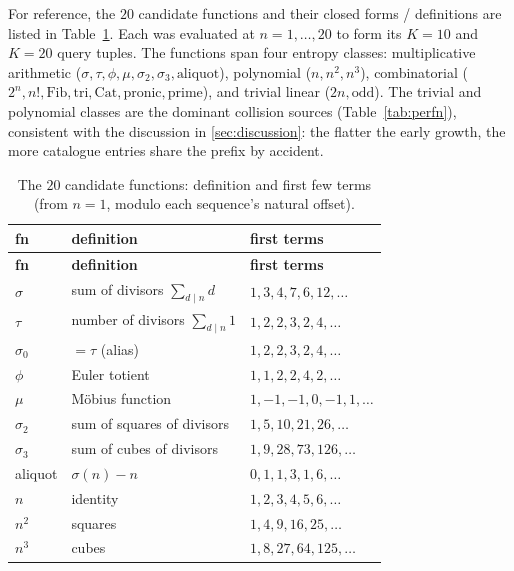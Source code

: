 \documentclass[11pt,a4paper]{article}
\newcommand{\sig}{\sigma}
\newcommand{\Kten}{K\!=\!10}
\newcommand{\Ktwenty}{K\!=\!20}
\theoremstyle{definition}
\begin{document}
For reference, the $20$ candidate functions and their closed forms / definitions
are listed in Table~\ref{tab:defs}. Each was evaluated at $n=1,\dots,20$ to form
its $\Kten$ and $\Ktwenty$ query tuples. The functions span four entropy classes:
multiplicative arithmetic ($\sig,\tau,\phi,\mu,\sig_2,\sig_3,\text{aliquot}$),
polynomial ($n,n^2,n^3$), combinatorial ($2^n,n!,\text{Fib},\text{tri},
\text{Cat},\text{pronic},\text{prime}$), and trivial linear ($2n,\text{odd}$).
The trivial and polynomial classes are the dominant collision sources
(Table~\ref{tab:perfn}), consistent with the discussion in
\textsection\ref{sec:discussion}: the flatter the early growth, the more
catalogue entries share the prefix by accident.

\begin{longtable}{@{}lll@{}}
\caption{The $20$ candidate functions: definition and first few terms (from
$n=1$, modulo each sequence's natural offset).}
\label{tab:defs}\\
\toprule
\textbf{fn} & \textbf{definition} & \textbf{first terms}\\
\midrule
\endfirsthead
\toprule
\textbf{fn} & \textbf{definition} & \textbf{first terms}\\
\midrule
\endhead
$\sig$      & sum of divisors $\sum_{d\mid n} d$        & $1,3,4,7,6,12,\dots$\\
$\tau$      & number of divisors $\sum_{d\mid n} 1$     & $1,2,2,3,2,4,\dots$\\
$\sig_0$    & $=\tau$ (alias)                            & $1,2,2,3,2,4,\dots$\\
$\phi$      & Euler totient                             & $1,1,2,2,4,2,\dots$\\
$\mu$       & M\"obius function                          & $1,-1,-1,0,-1,1,\dots$\\
$\sig_2$    & sum of squares of divisors                & $1,5,10,21,26,\dots$\\
$\sig_3$    & sum of cubes of divisors                  & $1,9,28,73,126,\dots$\\
aliquot     & $\sig(n)-n$                                & $0,1,1,3,1,6,\dots$\\
$n$         & identity                                  & $1,2,3,4,5,6,\dots$\\
$n^2$       & squares                                   & $1,4,9,16,25,\dots$\\
$n^3$       & cubes                                     & $1,8,27,64,125,\dots$\\

\end{longtable}
\end{document}
